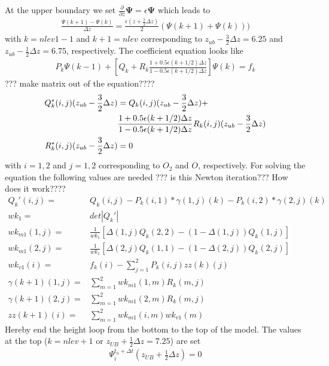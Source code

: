 At the upper boundary we set $\frac{\partial}{\partial z}
\mathbf{\Psi} = \epsilon \mathbf{\Psi}$ which leads to
%
\begin{align}
 \frac{\Psi(k+1) - \Psi(k)}{\Delta z} = \frac{\epsilon(z+\frac{1}{2}\Delta z)}{2}
 (\Psi(k+1)+\Psi(k)))
\end{align}
%
with $k= nlev1-1$ and $k+1=nlev$ corresponding to
$z_{ub}-\frac{3}{2}\Delta z=6.25$ and $z_{ub}-\frac{1}{2}\Delta
z=6.75$, respectively. The coefficient equation looks like
%
\begin{align}
  P_k \Psi(k-1) + [Q_k + R_k \frac{1 + 0.5 \epsilon(k+1/2) \Delta z}
  {1 - 0.5 \epsilon(k+1/2) \Delta z}]\Psi(k) = f_k
\end{align}
%
??? make matrix out of the equation????
%
%
\begin{align}
 Q_k^*(i,j)(z_{ub}-\frac{3}{2}\Delta z) & = Q_k(i,j)(z_{ub}-\frac{3}{2}\Delta z)
 + \notag \\
   & \frac{1 + 0.5 \epsilon(k+1/2) \Delta z}{1 - 0.5 \epsilon(k+1/2) \Delta
   z} R_k(i,j)(z_{ub}-\frac{3}{2}\Delta z) \\
  R_k^*(i,j)(z_{ub}-\frac{3}{2}\Delta z) & = 0
\end{align}
%
with $i = 1, 2$ and $j=1, 2$ corresponding to $O_2$ and $O$,
respectively.
%
For solving the equation the following values are needed ??? is this
Newton iteration??? How does it work????
%
\begin{align}
  Q_k'(i,j) = & Q_k(i,j) - P_k(i,1)*\gamma(1,j)(k)-
     P_k(i,2)*\gamma(2,j)(k) \\
  wk_1    = & det|Q_k'| \\
  wk_{m1}(1,j) = & \frac{1}{wk_1} [\Delta(1,j)Q_k(2,2) - (1-\Delta(1,j))Q_k(1,j)] \\
  wk_{m1}(2,j) = & \frac{1}{wk_1} [\Delta(2,j)Q_k(1,1) - (1-\Delta(2,j))Q_k(2,j)] \\
  wk_{v1}(i) = & f_k(i) - \sum_{j=1}^2 P_k(i,j)zz(k)(j) \\
  \gamma(k+1)(1,j) = & \sum_{m=1}^2 wk_{m1}(1,m) R_k(m,j)\\
  \gamma(k+1)(2,j) = & \sum_{m=1}^2 wk_{m1}(2,m) R_k(m,j) \\
  zz(k+1)(i) = &  \sum_{m=1}^2 wk_{m1}(i,m) wk_{v1}(m)
\end{align}
%
Hereby end the height loop from the bottom to the top of the model.
The values at the top ($k=nlev+1$ or $z_{UB}+\frac{1}{2}\Delta z =
7.25$) are set
%
\begin{align}
   \Psi_i^{t_n+\Delta t}(z_{UB}+\frac{1}{2}\Delta z) = 0
\end{align}
